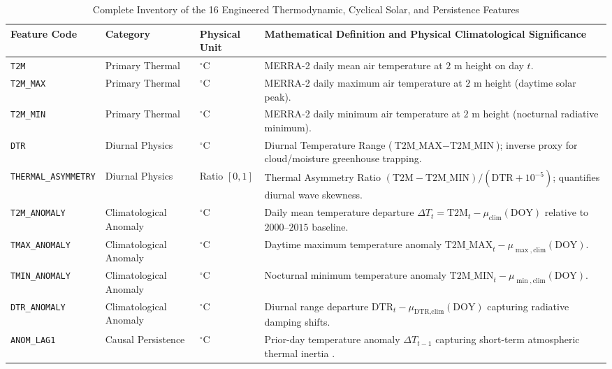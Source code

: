 \documentclass[conference]{IEEEtran}
\begin{document}
\begin{table}[!t]
\centering
\caption{Complete Inventory of the 16 Engineered Thermodynamic, Cyclical Solar, and Persistence Features}
\label{tab:feature_inventory}
\footnotesize
\setlength{\tabcolsep}{4.5pt}
\renewcommand{\arraystretch}{1.15}
\begin{tabularx}{\textwidth}{l l l X}
\toprule
\textbf{Feature Code} & \textbf{Category} & \textbf{Physical Unit} & \textbf{Mathematical Definition and Physical Climatological Significance} \\
\midrule
\texttt{T2M} & Primary Thermal & $^\circ\text{C}$ & MERRA-2 daily mean air temperature at $2\text{ m}$ height on day $t$. \\
\texttt{T2M\_MAX} & Primary Thermal & $^\circ\text{C}$ & MERRA-2 daily maximum air temperature at $2\text{ m}$ height (daytime solar peak). \\
\texttt{T2M\_MIN} & Primary Thermal & $^\circ\text{C}$ & MERRA-2 daily minimum air temperature at $2\text{ m}$ height (nocturnal radiative minimum). \\
\texttt{DTR} & Diurnal Physics & $^\circ\text{C}$ & Diurnal Temperature Range ($\text{T2M\_MAX} - \text{T2M\_MIN}$); inverse proxy for cloud/moisture greenhouse trapping. \\
\texttt{THERMAL\_ASYMMETRY} & Diurnal Physics & Ratio $[0,1]$ & Thermal Asymmetry Ratio $(\text{T2M} - \text{T2M\_MIN}) / (\text{DTR} + 10^{-5})$; quantifies diurnal wave skewness. \\
\texttt{T2M\_ANOMALY} & Climatological Anomaly & $^\circ\text{C}$ & Daily mean temperature departure $\Delta T_t = \text{T2M}_t - \mu_{\text{clim}}(\text{DOY})$ relative to $2000\text{--}2015$ baseline. \\
\texttt{TMAX\_ANOMALY} & Climatological Anomaly & $^\circ\text{C}$ & Daytime maximum temperature anomaly $\text{T2M\_MAX}_t - \mu_{\max,\text{clim}}(\text{DOY})$. \\
\texttt{TMIN\_ANOMALY} & Climatological Anomaly & $^\circ\text{C}$ & Nocturnal minimum temperature anomaly $\text{T2M\_MIN}_t - \mu_{\min,\text{clim}}(\text{DOY})$. \\
\texttt{DTR\_ANOMALY} & Climatological Anomaly & $^\circ\text{C}$ & Diurnal range departure $\text{DTR}_t - \mu_{\text{DTR},\text{clim}}(\text{DOY})$ capturing radiative damping shifts. \\
\texttt{ANOM\_LAG1} & Causal Persistence & $^\circ\text{C}$ & Prior-day temperature anomaly $\Delta T_{t-1}$ capturing short-term atmospheric thermal inertia \cite{nepal2025}. \\

\end{tabularx}
\end{table}
\end{document}
